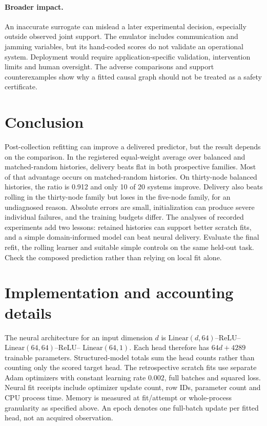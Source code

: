 \paragraph{Broader impact.}
An inaccurate surrogate can mislead a later experimental decision, especially
outside observed joint support. The emulator includes communication
and jamming variables, but its hand-coded scores do not validate an operational
system. Deployment would require application-specific validation, intervention
limits and human oversight. The adverse comparisons and support counterexamples
show why a fitted causal graph should not be treated as a safety certificate.

\section{Conclusion}
Post-collection refitting can improve a delivered predictor, but the result
depends on the comparison. In the registered equal-weight average over balanced
and matched-random histories, delivery beats flat in both prospective families.
Most of that advantage occurs on matched-random histories. On thirty-node
balanced histories, the ratio is 0.912 and only 10 of 20 systems improve.
Delivery also beats rolling in the thirty-node family but loses in the five-node
family, for an undiagnosed reason. Absolute errors are small, initialization
can produce severe individual failures, and the training budgets differ.
The analyses of recorded experiments add two lessons: retained histories can support better
scratch fits, and a simple domain-informed model can beat neural delivery.
Evaluate the final refit, the rolling learner and suitable simple controls on
the same held-out task. Check the composed prediction rather than relying on
local fit alone.




\appendix
\section{Implementation and accounting details}
\label{app:implementation}
The neural architecture for an input dimension $d$ is
$\mathrm{Linear}(d,64)$--ReLU--$\mathrm{Linear}(64,64)$--ReLU--
$\mathrm{Linear}(64,1)$. Each head therefore has $64d+4289$ trainable
parameters. Structured-model totals sum the head counts rather than counting
only the scored target head. The retrospective scratch fits use separate Adam
optimizers with constant learning rate $0.002$, full batches and squared loss.
Neural fit receipts include optimizer update count, row IDs, parameter count
and CPU process time. Memory is measured at fit/attempt or whole-process
granularity as specified above. An epoch denotes one full-batch update
per fitted head, not an acquired observation.

